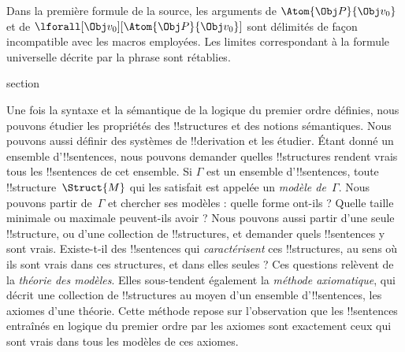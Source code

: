 \documentclass[11pt,a4paper,openany]{memoir}
\begin{document}
\begin{editorial}
Dans la première formule de la source, les arguments de
$\Atom{\Obj P}{\Obj v_0}$ et de
$\lforall[\Obj v_0][\Atom{\Obj P}{\Obj v_0}]$ sont délimités de façon
incompatible avec les macros employées. Les limites correspondant à la
formule universelle décrite par la phrase sont rétablies.
\end{editorial}


\endgroup



\begingroup
\expandafter\def\csname ol@sectioncs\endcsname{section}
\def\olfilename{models-theories}




Une fois la syntaxe et la sémantique de la logique du premier ordre
définies, nous pouvons étudier les propriétés des !!{structure}s et des
notions sémantiques. Nous pouvons aussi définir des systèmes de
!!{derivation} et les étudier. Étant donné un ensemble
d'!!{sentence}s, nous pouvons demander quelles !!{structure}s rendent
vrais tous les !!{sentence}s de cet ensemble. Si $\Gamma$ est un
ensemble d'!!{sentence}s, toute !!{structure}~$\Struct{M}$ qui les
satisfait est appelée un \emph{modèle de~$\Gamma$}. Nous pouvons partir
de~$\Gamma$ et chercher ses modèles : quelle forme ont-ils ? Quelle
taille minimale ou maximale peuvent-ils avoir ? Nous pouvons aussi
partir d'une seule !!{structure}, ou d'une collection de
!!{structure}s, et demander quels !!{sentence}s y sont vrais.
Existe-t-il des !!{sentence}s qui \emph{caractérisent} ces
!!{structure}s, au sens où ils sont vrais dans ces structures, et dans
elles seules ? Ces questions relèvent de la \emph{théorie des
modèles}. Elles sous-tendent également la \emph{méthode axiomatique},
qui décrit une collection de !!{structure}s au moyen d'un ensemble
d'!!{sentence}s, les axiomes d'une théorie. Cette méthode repose sur
l'observation que les !!{sentence}s entraînés en logique du premier
ordre par les axiomes sont exactement ceux qui sont vrais dans tous les
modèles de ces axiomes.
\end{document}
